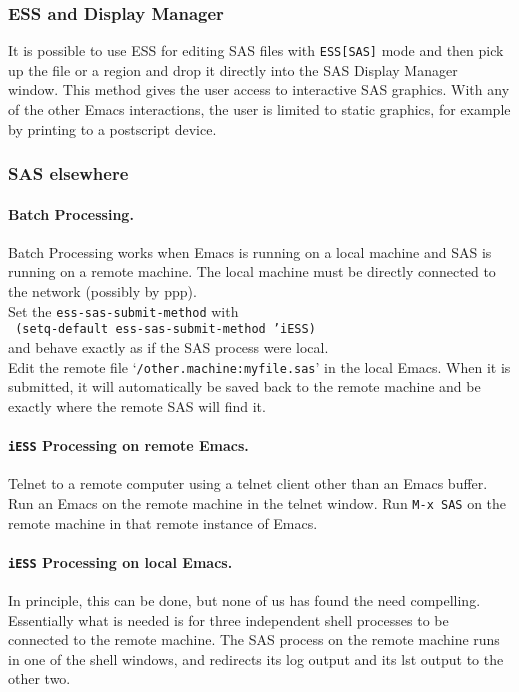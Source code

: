 \documentclass{article}
\newcommand{\stexttt}[1]{{\small\texttt{#1}}}
\newcommand{\ssf}[1]{{\small\sf{#1}}}
\newcommand{\elcode}[1]{\\{\stexttt{\hspace*{2em} #1}}\\}
\newcommand{\file}[1]{`\stexttt{#1}'}
\begin{document}
\subsubsection{ESS and Display Manager}
It is possible to use ESS for editing SAS files with \stexttt{ESS[SAS]} mode
and then pick up the file or a region and drop it directly into the SAS
Display Manager \ssf{Program Editor} window.
This method gives the user access to
interactive SAS graphics.  With any of the other Emacs interactions, the user
is limited to static graphics, for example by printing to a postscript device.

\subsubsection{SAS elsewhere}

\paragraph{Batch Processing.}
Batch Processing works when Emacs is running on a local machine and SAS
is running on a remote machine.  The local machine must be directly
connected to the network (possibly by ppp).\\
Set the \stexttt{ess-sas-submit-method} with
\elcode{(setq-default ess-sas-submit-method 'iESS)}
and behave exactly as if the SAS process were local.\\
Edit the remote file
\file{/other.machine:myfile.sas}
in the local Emacs.
When it is submitted, it will automatically be saved back to the remote
machine and be exactly where the remote SAS will find it.

\paragraph{\stexttt{iESS} Processing on remote Emacs.}
Telnet to a remote computer using a telnet client other than an Emacs buffer.
Run an Emacs on the remote machine in the telnet window.
Run \stexttt{M-x SAS} on the remote machine in that remote instance of Emacs.

\paragraph{\stexttt{iESS} Processing on local Emacs.}
In principle, this can be done, but none of us has found the need
compelling.  Essentially what is needed is for three independent shell
processes to be connected to the remote machine.  The SAS process on
the remote machine runs in one of the shell windows, and redirects its
log output and its lst output to the other two.
\end{document}

